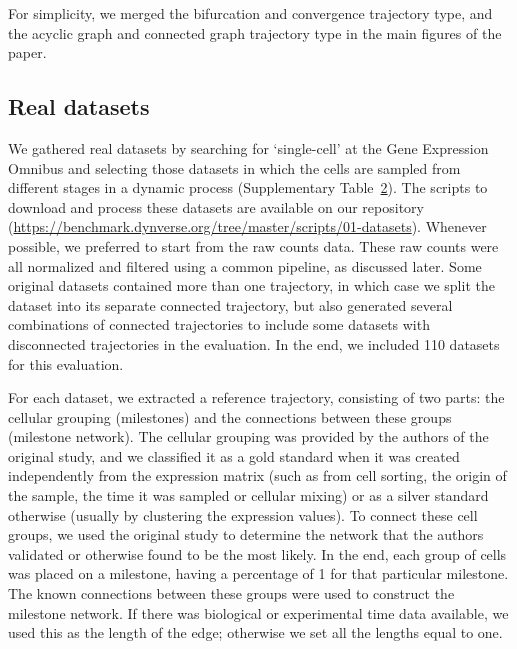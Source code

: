 For simplicity, we merged the bifurcation and convergence trajectory type, and the acyclic graph and connected graph trajectory type in the main figures of the paper.


\subsection{Real datasets}

We gathered real datasets by searching for ‘single-cell’ at the Gene Expression Omnibus and selecting those datasets in which the cells are sampled from different stages in a dynamic process (Supplementary Table~\href{https://static-content.springer.com/esm/art\%3A10.1038\%2Fs41587-019-0071-9/MediaObjects/41587\_2019\_71\_MOESM4\_ESM.xlsx}{2}). The scripts to download and process these datasets are available on our repository (\href{https://benchmark.dynverse.org/tree/master/scripts/01-datasets}{https://benchmark.dynverse.org/tree/master/scripts/01-datasets}). Whenever possible, we preferred to start from the raw counts data. These raw counts were all normalized and filtered using a common pipeline, as discussed later. Some original datasets contained more than one trajectory, in which case we split the dataset into its separate connected trajectory, but also generated several combinations of connected trajectories to include some datasets with disconnected trajectories in the evaluation. In the end, we included 110 datasets for this evaluation.

For each dataset, we extracted a reference trajectory, consisting of two parts: the cellular grouping (milestones) and the connections between these groups (milestone network). The cellular grouping was provided by the authors of the original study, and we classified it as a gold standard when it was created independently from the expression matrix (such as from cell sorting, the origin of the sample, the time it was sampled or cellular mixing) or as a silver standard otherwise (usually by clustering the expression values). To connect these cell groups, we used the original study to determine the network that the authors validated or otherwise found to be the most likely. In the end, each group of cells was placed on a milestone, having a percentage of 1 for that particular milestone. The known connections between these groups were used to construct the milestone network. If there was biological or experimental time data available, we used this as the length of the edge; otherwise we set all the lengths equal to one.

